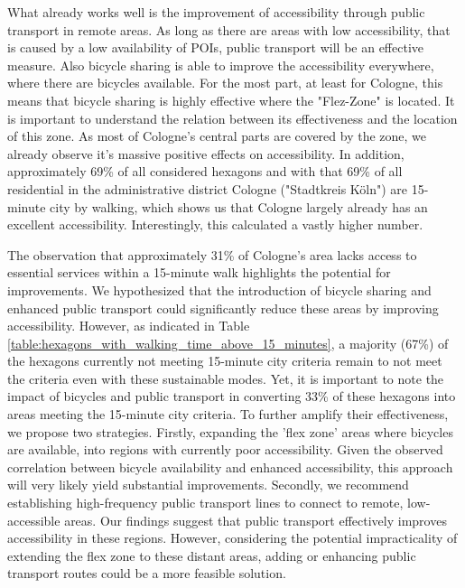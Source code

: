 What already works well is the improvement of accessibility through public transport in remote areas.
As long as there are areas with low accessibility, that is caused by a low availability of POIs, public transport will be an effective measure.
Also bicycle sharing is able to improve the accessibility everywhere, where there are bicycles available.
For the most part, at least for Cologne, this means that bicycle sharing is highly effective where the "Flez-Zone" is located.
It is important to understand the relation between its effectiveness and the location of this zone.
As most of Cologne's central parts are covered by the zone, we already observe it's massive positive effects on accessibility.
In addition, approximately 69\% of all considered hexagons and with that 69\% of all residential in the administrative district Cologne ("Stadtkreis Köln") are 15-minute city by walking, which shows us that Cologne largely already has an excellent accessibility.
Interestingly, this  calculated a vastly higher number. 

The observation that approximately 31\% of Cologne's area lacks access to essential services within a 15-minute walk highlights the potential for improvements.
We hypothesized that the introduction of bicycle sharing and enhanced public transport could significantly reduce these areas by improving accessibility.
However, as indicated in Table \ref{table:hexagons_with_walking_time_above_15_minutes}, a majority (67\%) of the hexagons currently not meeting 15-minute city criteria remain to not meet the criteria even with these sustainable modes.
Yet, it is important to note the impact of bicycles and public transport in converting 33\% of these hexagons into areas meeting the 15-minute city criteria.
To further amplify their effectiveness, we propose two strategies.
Firstly, expanding the 'flex zone' areas where bicycles are available, into regions with currently poor accessibility. 
Given the observed correlation between bicycle availability and enhanced accessibility, this approach will very likely yield substantial improvements.
Secondly, we recommend establishing high-frequency public transport lines to connect to remote, low-accessible areas. 
Our findings suggest that public transport effectively improves accessibility in these regions. 
However, considering the potential impracticality of extending the flex zone to these distant areas, adding or enhancing public transport routes could be a more feasible solution.

